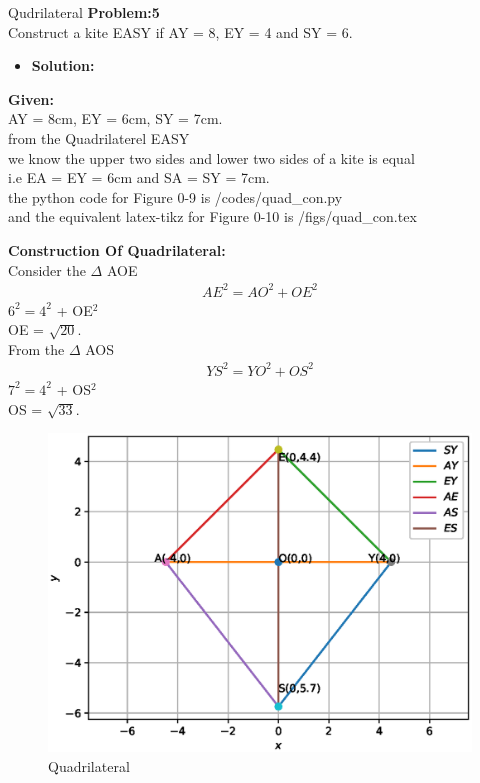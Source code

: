 \begin{frame}{Qudrilateral}
{\textbf{Problem:5}\\Construct a kite EASY if AY = 8, EY = 4 and SY = 6.}
\begin{itemize}
\item \textbf{Solution:}
\end{itemize}
\textbf{Given:}\\
AY = 8cm, EY = 6cm, SY = 7cm.\\
from the Quadrilaterel EASY\\
we know the upper two sides and lower two sides of a kite is equal\\ 
i.e EA = EY = 6cm and SA = SY = 7cm.\\

the python code for  Figure 0-9 is /codes/quad\_con.py\\
and the equivalent latex-tikz for Figure 0-10 is /figs/quad\_con.tex
\end{frame}
\begin{frame}
\textbf{Construction Of Quadrilateral:}\\
Consider the $\Delta$ AOE
\begin{align}
AE^2 = AO^2 + OE^2
\end{align}
$6^2 = 4^2$ + OE$^2$\\
OE = $\sqrt{20}$.\\
From the $\Delta$ AOS
\begin{align}
YS^2 = YO^2 + OS^2
\end{align}
$7^2 = 4^2$ + OS$^2$\\
OS = $\sqrt{33}.$\\
\end{frame}
\begin{frame}{}
\begin{figure}[!ht]
	\begin{center}
\includegraphics[width=0.8\columnwidth]{./figs/quad_con.eps}
	\end{center}
	\caption{Quadrilateral}
	\label{}	
\end{figure}
\end{frame}
